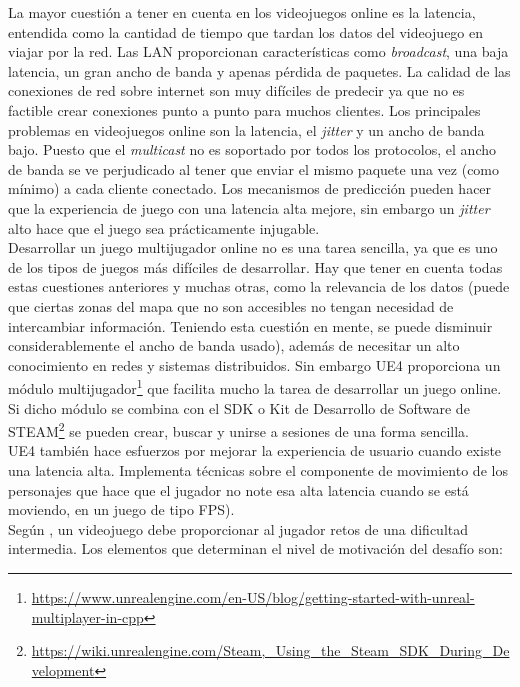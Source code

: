 La mayor cuestión a tener en cuenta en los videojuegos online es la latencia, entendida como la cantidad de tiempo que tardan los datos del videojuego en viajar por la red. Las \ac{LAN} proporcionan características como \textit{broadcast}, una baja latencia, un gran ancho de banda y apenas pérdida de paquetes. La calidad de las conexiones de red sobre internet son muy difíciles de predecir ya que no es factible crear conexiones punto a punto para muchos clientes. Los principales problemas en videojuegos online \cite{9} son la latencia, el \textit{jitter} y un ancho de banda bajo. Puesto que el \textit{multicast} no es soportado por todos los protocolos, el ancho de banda se ve perjudicado al tener que enviar el mismo paquete una vez (como mínimo) a cada cliente conectado. Los mecanismos de predicción pueden hacer que la experiencia de juego con una latencia alta mejore, sin embargo un \textit{jitter} alto hace que el juego sea prácticamente injugable.\\


Desarrollar un juego multijugador online no es una tarea sencilla, ya que es uno de los tipos de juegos más difíciles de desarrollar. Hay que tener en cuenta todas estas cuestiones anteriores y muchas otras, como la relevancia de los datos (puede que ciertas zonas del mapa que no son accesibles no tengan necesidad de intercambiar información. Teniendo esta cuestión en mente, se puede disminuir considerablemente el ancho de banda usado), además de necesitar un alto conocimiento en redes y sistemas distribuidos. Sin embargo \acs{UE4} proporciona un módulo multijugador\footnote{\url{https://www.unrealengine.com/en-US/blog/getting-started-with-unreal-multiplayer-in-cpp}} que facilita mucho la tarea de desarrollar un juego online. Si dicho módulo se combina con el \ac{SDK} o Kit de Desarrollo de Software de STEAM\footnote{\url{https://wiki.unrealengine.com/Steam,_Using_the_Steam_SDK_During_Development}} se pueden crear, buscar y unirse a sesiones de una forma sencilla.\\


\acs{UE4} también hace esfuerzos por mejorar la experiencia de usuario cuando existe una latencia alta. Implementa técnicas sobre el componente de movimiento de los personajes que hace que el jugador no note esa alta latencia cuando se está moviendo, en un juego de tipo \acs{FPS}).\\


Según \cite{10}, un videojuego debe proporcionar al jugador retos de una dificultad intermedia. Los elementos que determinan el nivel de motivación del desafío son:

